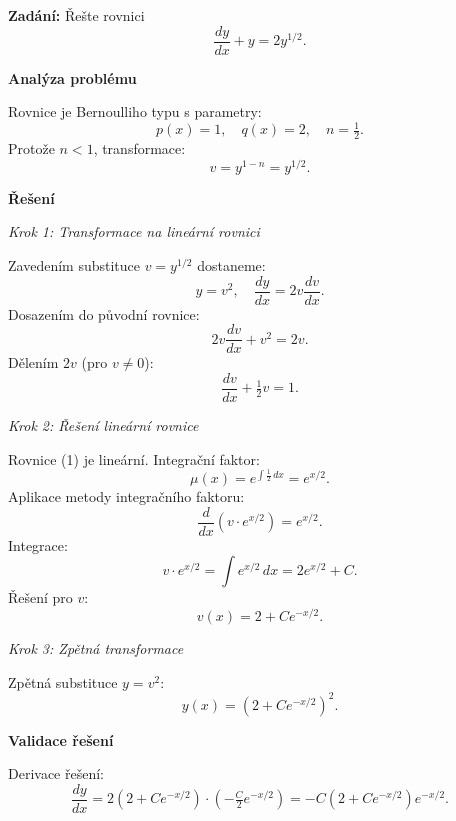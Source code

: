 \begin{example}
    \label{ex:a1-stredni-zlomkove-n}
    
    \noindent\textbf{Zadání:} Řešte rovnici
    \[
    \frac{dy}{dx} + y = 2y^{1/2}.
    \]
    
    \vspace{1.5\baselineskip}
    
    \noindent\textbf{Analýza problému}
    
    \noindent Rovnice je Bernoulliho typu s parametry:
    \[
    p(x) = 1, \quad q(x) = 2, \quad n = \tfrac{1}{2}.
    \]
    Protože $n < 1$, transformace:
    \[
    v = y^{1-n} = y^{1/2}.
    \]
    
    \vspace{1.5\baselineskip}
    
    \noindent\textbf{Řešení}
    
    \noindent\textit{Krok 1: Transformace na lineární rovnici}
    
    Zavedením substituce $v = y^{1/2}$ dostaneme:
    \[
    y = v^2, \quad \frac{dy}{dx} = 2v\frac{dv}{dx}.
    \]
    Dosazením do původní rovnice:
    \[
    2v\frac{dv}{dx} + v^2 = 2v.
    \]
    Dělením $2v$ (pro $v \neq 0$):
    \[
    \frac{dv}{dx} + \tfrac{1}{2}v = 1. \tag{1}
    \]
    
    \vspace{1\baselineskip}
    
    \noindent\textit{Krok 2: Řešení lineární rovnice}
    
    Rovnice (1) je lineární. Integrační faktor:
    \[
    \mu(x) = e^{\int \tfrac{1}{2}\,dx} = e^{x/2}.
    \]
    Aplikace metody integračního faktoru:
    \[
    \frac{d}{dx}(v \cdot e^{x/2}) = e^{x/2}.
    \]
    Integrace:
    \[
    v \cdot e^{x/2} = \int e^{x/2}\,dx = 2e^{x/2} + C.
    \]
    Řešení pro $v$:
    \[
    v(x) = 2 + Ce^{-x/2}. \tag{2}
    \]
    
    \vspace{1\baselineskip}
    
    \noindent\textit{Krok 3: Zpětná transformace}
    
    Zpětná substituce $y = v^2$:
    \[
    y(x) = (2 + Ce^{-x/2})^2. \tag{3}
    \]
    
    \vspace{1.5\baselineskip}
    
    \noindent\textbf{Validace řešení}
    
    Derivace řešení:
    \[
    \frac{dy}{dx} = 2(2 + Ce^{-x/2}) \cdot \left(-\tfrac{C}{2}e^{-x/2}\right) = -C(2 + Ce^{-x/2})e^{-x/2}.
    \]
    

\end{example}
